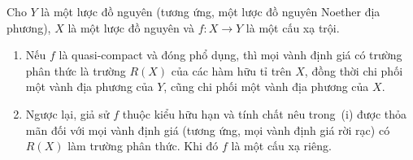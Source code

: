 
\begin{corollary}[7.3.10]
\label{II.7.3.10}
Cho $Y$ là một lược đồ nguyên (tương ứng, một lược đồ nguyên Noether địa phương), $X$ là một lược đồ nguyên và $f:X\to Y$ là một cấu xạ trội.
\begin{enumerate}
  \item[\rm{(i)}] Nếu $f$ là quasi-compact và đóng phổ dụng, thì mọi vành định giá có trường phân thức là trường $R(X)$ của các hàm hữu tỉ trên $X$, đồng thời chi phối một vành địa phương của $Y$, cũng chi phối một vành địa phương của $X$.
  \item[\rm{(ii)}] Ngược lại, giả sử $f$ thuộc kiểu hữu hạn và tính chất nêu trong~(i) được thỏa mãn đối với mọi vành định giá (tương ứng, mọi vành định giá rời rạc) có $R(X)$ làm trường phân thức.
  Khi đó $f$ là một cấu xạ riêng.
\end{enumerate}
\end{corollary}

